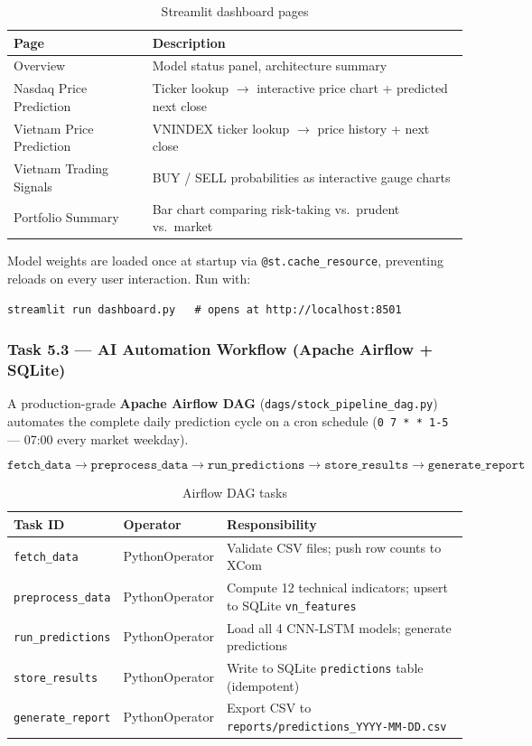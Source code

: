\documentclass[12pt,a4paper]{article}
\begin{document}
\begin{table}[H]
\centering
\caption{Streamlit dashboard pages}
\begin{tabularx}{\linewidth}{lX}
\toprule
\textbf{Page} & \textbf{Description} \\
\midrule
Overview                  & Model status panel, architecture summary \\
Nasdaq Price Prediction   & Ticker lookup $\to$ interactive price chart + predicted next close \\
Vietnam Price Prediction  & VNINDEX ticker lookup $\to$ price history + next close \\
Vietnam Trading Signals   & BUY / SELL probabilities as interactive gauge charts \\
Portfolio Summary         & Bar chart comparing risk-taking vs.\ prudent vs.\ market \\
\bottomrule
\end{tabularx}
\end{table}

Model weights are loaded once at startup via \texttt{@st.cache\_resource},
preventing reloads on every user interaction. Run with:

\begin{lstlisting}[style=bash]
streamlit run dashboard.py   # opens at http://localhost:8501
\end{lstlisting}

\subsubsection{Task 5.3 --- AI Automation Workflow (Apache Airflow + SQLite)}

A production-grade \textbf{Apache Airflow DAG}
(\texttt{dags/stock\_pipeline\_dag.py}) automates the complete daily prediction
cycle on a cron schedule (\texttt{0 7 * * 1-5} --- 07:00 every market weekday).

\[
\texttt{fetch\_data} \to \texttt{preprocess\_data} \to \texttt{run\_predictions}
\to \texttt{store\_results} \to \texttt{generate\_report}
\]

\begin{table}[H]
\centering
\caption{Airflow DAG tasks}
\begin{tabularx}{\linewidth}{llX}
\toprule
\textbf{Task ID} & \textbf{Operator} & \textbf{Responsibility} \\
\midrule
\texttt{fetch\_data}      & PythonOperator & Validate CSV files; push row counts to XCom \\
\texttt{preprocess\_data} & PythonOperator & Compute 12 technical indicators; upsert to SQLite \texttt{vn\_features} \\
\texttt{run\_predictions} & PythonOperator & Load all 4 CNN-LSTM models; generate predictions \\
\texttt{store\_results}   & PythonOperator & Write to SQLite \texttt{predictions} table (idempotent) \\
\texttt{generate\_report} & PythonOperator & Export CSV to \texttt{reports/predictions\_YYYY-MM-DD.csv} \\
\bottomrule
\end{tabularx}
\end{table}
\end{document}
